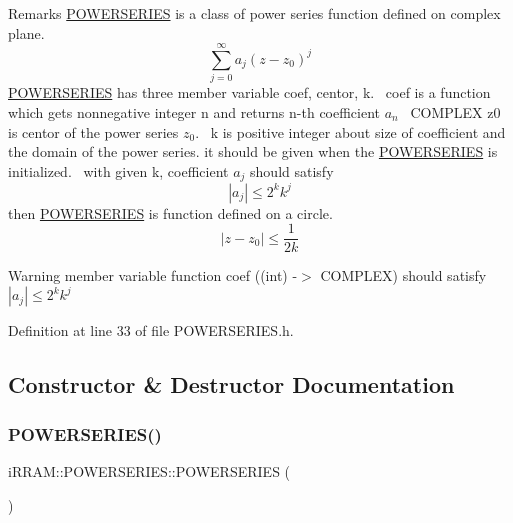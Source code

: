 \begin{DoxyRemark}{Remarks}
\mbox{\hyperlink{classi_r_r_a_m_1_1_p_o_w_e_r_s_e_r_i_e_s}{P\+O\+W\+E\+R\+S\+E\+R\+I\+ES}} is a class of power series function defined on complex plane. \[ \displaystyle\sum_{j=0}^{\infty}{a_j (z - z_0)^j} \] \mbox{\hyperlink{classi_r_r_a_m_1_1_p_o_w_e_r_s_e_r_i_e_s}{P\+O\+W\+E\+R\+S\+E\+R\+I\+ES}} has three member variable coef, centor, k.~\newline
coef is a function which gets nonnegative integer n and returns n-\/th coefficient $a_n$~\newline
C\+O\+M\+P\+L\+EX z0 is centor of the power series $z_0 $.~\newline
k is positive integer about size of coefficient and the domain of the power series. it should be given when the \mbox{\hyperlink{classi_r_r_a_m_1_1_p_o_w_e_r_s_e_r_i_e_s}{P\+O\+W\+E\+R\+S\+E\+R\+I\+ES}} is initialized.~\newline
with given k, coefficient $ a_j $ should satisfy \[ |a_j| \leq 2^k k^j \] then \mbox{\hyperlink{classi_r_r_a_m_1_1_p_o_w_e_r_s_e_r_i_e_s}{P\+O\+W\+E\+R\+S\+E\+R\+I\+ES}} is function defined on a circle. \[ |z-z_0| \leq \frac{1}{2k} \]
\end{DoxyRemark}
\begin{DoxyWarning}{Warning}
member variable function coef ((int) -\/$>$ C\+O\+M\+P\+L\+EX) should satisfy $ |a_j| \leq 2^k k^j $ 
\end{DoxyWarning}


Definition at line 33 of file P\+O\+W\+E\+R\+S\+E\+R\+I\+E\+S.\+h.



\subsection{Constructor \& Destructor Documentation}
\mbox{\label{classi_r_r_a_m_1_1_p_o_w_e_r_s_e_r_i_e_s_aa5e77b80466e6bb11f7e02371900e59b}} 
\subsubsection{\texorpdfstring{POWERSERIES()}{POWERSERIES()}\hspace{0.1cm}{\footnotesize\ttfamily [1/5]}}
{\footnotesize\ttfamily i\+R\+R\+A\+M\+::\+P\+O\+W\+E\+R\+S\+E\+R\+I\+E\+S\+::\+P\+O\+W\+E\+R\+S\+E\+R\+I\+ES (\begin{DoxyParamCaption}{ }\end{DoxyParamCaption})}



